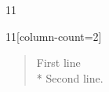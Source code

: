 \documentclass[paper=A4]{ropas-poster}
\begin{document}
\begin{postergrid}{1}{1}
\begin{posterblock}{1}{1}[column-count=2]
\begin{verse}First line\\*
Second line.\end{verse}
\end{posterblock}
\end{postergrid}
\end{document}
